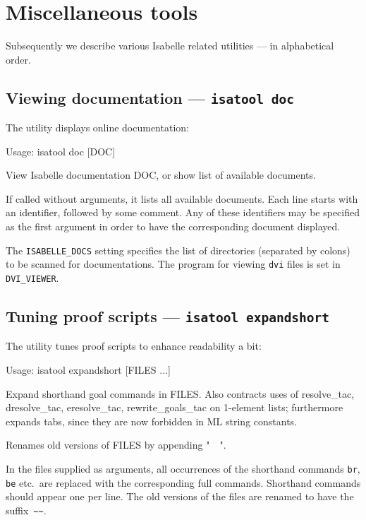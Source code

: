 

\chapter{Miscellaneous tools}

Subsequently we describe various Isabelle related utilities --- in
alphabetical order.


\section{Viewing documentation --- \texttt{isatool doc}} \label{sec:tool-doc}

The  utility displays online documentation:
\begin{ttbox}
Usage: isatool doc [DOC]

  View Isabelle documentation DOC, or show list of available documents.
\end{ttbox}
If called without arguments, it lists all available documents. Each
line starts with an identifier, followed by some comment. Any of these
identifiers may be specified as the first argument in order to have
the corresponding document displayed.

\medskip The \texttt{ISABELLE_DOCS} setting specifies the list of
directories (separated by colons) to be scanned for documentations.
The program for viewing \texttt{dvi} files is set in
\texttt{DVI_VIEWER}.


\section{Tuning proof scripts --- \texttt{isatool expandshort}}

The  utility tunes {\ML} proof scripts to enhance
readability a bit:
\begin{ttbox}
Usage: isatool expandshort [FILES ...]

  Expand shorthand goal commands in FILES.  Also contracts uses of
  resolve_tac, dresolve_tac, eresolve_tac, rewrite_goals_tac on
  1-element lists; furthermore expands tabs, since they are now
  forbidden in ML string constants.

  Renames old versions of FILES by appending "~~".
\end{ttbox}
In the files supplied as arguments, all occurrences of the shorthand
commands \texttt{br}, \texttt{be} etc.\ are replaced with the
corresponding full commands.  Shorthand commands should appear one per
line.  The old versions of the files are renamed to have the
suffix~\verb'~~'.


